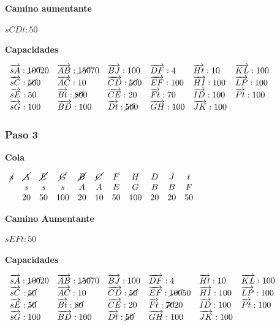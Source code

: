 \documentclass[10pt,a4paper]{article}
\begin{document}
\textbf{Camino aumentante}

$sCDt:50$

\textbf{Capacidades}

$\begin{array}{llllll} \overrightarrow{sA}: \cancel{100}20& \overrightarrow{AB}: \cancel{150} 70&\overrightarrow{BJ}: 100&\overrightarrow{DF}: 4&\overrightarrow{Ht}: 10&\overrightarrow{KL}: 100\\ \overrightarrow{sC}: \cancel{50}0& \overrightarrow{AC}: 10&\overrightarrow{CD}: \cancel{50}0&\overrightarrow{EF}: 100&\overrightarrow{HI}: 100&\overrightarrow{LP}: 100\\ \overrightarrow{sE}: 50& \overrightarrow{Bt}: \cancel{80} 0&\overrightarrow{CE}: 20&\overrightarrow{Ft}: 70&\overrightarrow{ID}: 100&\overrightarrow{Pt}: 100\\ \overrightarrow{sG}: 100& \overrightarrow{BD}: 100&\overrightarrow{Dt}: \cancel{50}0&\overrightarrow{GH}: 100&\overrightarrow{JK}: 100&\\ \end{array}$

\subsubsection*{Paso 3}

\textbf{Cola}

\textbf{$\begin{array}{ccccccccccc} \cancel{s} & \cancel{A} & \cancel{E} & \cancel{G} & \cancel{B} & \cancel{C} & F & H & D &J& t\\ & s & s & s & A & A & E &G & B & B & F\\ & 20 & 50 & 100 & 20 & 10 & 50& 100 & 20 & 20 & 50 \end{array}$}

\textbf{Camino Aumentante}

\textbf{$sEFt:50$}

\textbf{Capacidades}

$\begin{array}{llllll} \overrightarrow{sA}: \cancel{100}20& \overrightarrow{AB}: \cancel{150} 70&\overrightarrow{BJ}: 100&\overrightarrow{DF}: 4&\overrightarrow{Ht}: 10&\overrightarrow{KL}: 100\\ \overrightarrow{sC}: \cancel{50}& \overrightarrow{AC}: 10&\overrightarrow{CD}: \cancel{50}&\overrightarrow{EF}: \cancel{100}50&\overrightarrow{HI}: 100&\overrightarrow{LP}: 100\\ \overrightarrow{sE}: \cancel{50}& \overrightarrow{Bt}: \cancel{80}&\overrightarrow{CE}: 20&\overrightarrow{Ft}: \cancel{70}20&\overrightarrow{ID}: 100&\overrightarrow{Pt}: 100\\ \overrightarrow{sG}: 100& \overrightarrow{BD}: 100&\overrightarrow{Dt}: \cancel{50}&\overrightarrow{GH}: 100&\overrightarrow{JK}: 100&\\ \end{array}$
\end{document}
